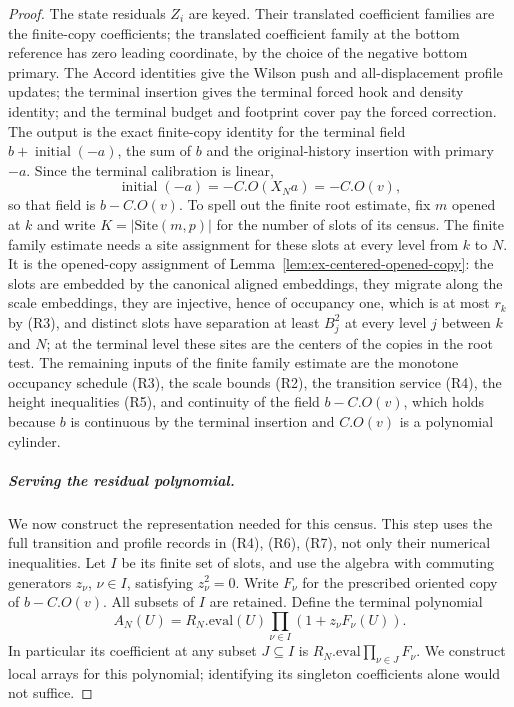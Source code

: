 \begin{proof}
The state residuals $Z_i$ are keyed. Their translated coefficient families are the
finite-copy coefficients; the translated coefficient family at the bottom reference has zero
leading coordinate, by the choice of the negative bottom primary.
The Accord identities give the Wilson push and all-displacement profile
updates; the terminal insertion gives the
terminal forced hook and density identity; and the terminal budget and footprint
cover pay the forced correction. The output is the exact finite-copy identity
for the terminal field $b+\operatorname{initial}(-a)$, the sum of $b$ and
the original-history insertion with primary $-a$. Since the terminal
calibration is linear,
\[
 \operatorname{initial}(-a)= -C.O(X_Na)=-C.O(v),
\]
so that field is $b-C.O(v)$. To spell out the finite root estimate,
fix $m$ opened at $k$ and write $K=|\mathrm{Site}(m,p)|$ for the number
of slots of its census. The finite family estimate needs a site
assignment for these slots at every level from $k$ to $N$. It is the
opened-copy assignment of Lemma~\ref{lem:ex-centered-opened-copy}: the
slots are embedded by the canonical aligned embeddings, they migrate
along the scale embeddings, they are injective, hence of occupancy one,
which is at most $r_k$ by (R3), and distinct slots have separation at
least $B_j^2$ at every level $j$ between $k$ and $N$; at the terminal
level these sites are the centers of the copies in the root test. The
remaining inputs of the finite family estimate are the monotone
occupancy schedule (R3), the scale bounds (R2), the transition service
(R4), the height inequalities (R5), and continuity of the field
$b-C.O(v)$, which holds because $b$ is continuous by the terminal insertion and
$C.O(v)$ is a polynomial cylinder.

\subparagraph{Serving the residual polynomial.}
\label{par:figment-served-residual}
We now construct the representation needed for this census. This step
uses the full transition and profile records in (R4), (R6), (R7), not
only their numerical inequalities. Let $I$ be its finite set of slots,
and use the algebra with commuting generators $z_\nu$, $\nu\in I$,
satisfying $z_\nu^2=0$. Write $F_\nu$ for the prescribed oriented copy of
$b-C.O(v)$. All subsets of $I$ are retained. Define the terminal polynomial
\begin{equation}
 A_N(U)=R_N.\mathrm{eval}(U)\prod_{\nu\in I}(1+z_\nu F_\nu(U)).
 \label{eq:actual-marked-portfolio-calibration-display-star}
\end{equation}
In particular its coefficient at any subset $J\subseteq I$ is
$R_N.\mathrm{eval}\prod_{\nu\in J}F_\nu$. We construct local arrays for
this polynomial; identifying its singleton coefficients alone would not
suffice.


\end{proof}
